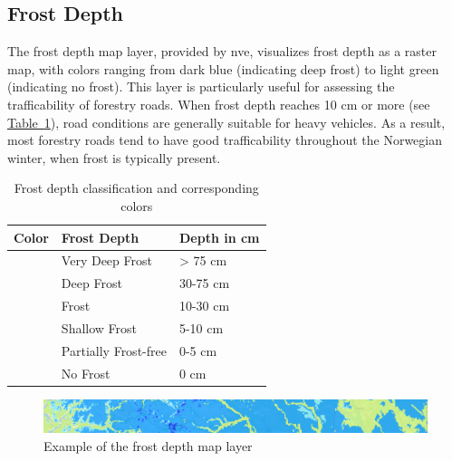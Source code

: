 \subsection{Frost Depth}

The frost depth map layer, provided by \acrshort{nve}, visualizes frost depth as a raster map, with colors ranging from dark blue (indicating deep frost) to light green (indicating no frost). This layer is particularly useful for assessing the trafficability of forestry roads. When frost depth reaches 10 cm or more (see \hyperref[tab:frost_depth_classification]{Table~\ref*{tab:frost_depth_classification}}), road conditions are generally suitable for heavy vehicles. As a result, most forestry roads tend to have good trafficability throughout the Norwegian winter, when frost is typically present.

\begin{table}[h]
    \centering
    \begin{tabular}{|l|l|l|}
        \hline  
        \textbf{Color} & \textbf{Frost Depth} & \textbf{Depth in cm} \\
        \hline
        \cellcolor[HTML]{00009c} & Very Deep Frost & > 75 cm \\
        \hline
        \cellcolor[HTML]{0018ff} & Deep Frost & 30-75 cm \\
        \hline
        \cellcolor[HTML]{009aff} & Frost & 10-30 cm \\
        \hline
        \cellcolor[HTML]{84ebff} & Shallow Frost & 5-10 cm \\
        \hline
        \cellcolor[HTML]{deffff} & Partially Frost-free & 0-5 cm \\
        \hline
        \cellcolor[HTML]{cef77b} & No Frost & 0 cm \\
        \hline
    \end{tabular}
    \caption{Frost depth classification and corresponding colors \cite{nve2025waterdata}}
    \label{tab:frost_depth_classification}
\end{table}

\begin{figure}[h]
    \centering
    \includegraphics[width=1\linewidth]{figures/teledyp_eksempel.pdf}
    \caption{Example of the frost depth map layer}
    \label{fig:frost_depth_example}
\end{figure}

